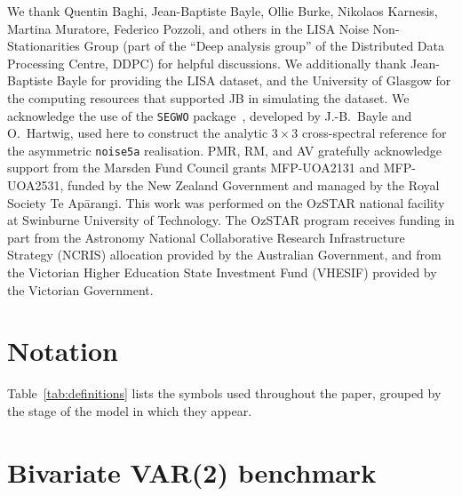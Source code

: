 \documentclass[%
	reprint,
	nofootinbib,
	amsmath,
	amssymb,
	aps,
]{revtex4-2}
\begin{document}
	\begin{acknowledgments}
		We thank Quentin Baghi, Jean-Baptiste Bayle, Ollie Burke, Nikolaos
		Karnesis, Martina Muratore, Federico Pozzoli, and others in the LISA Noise Non-Stationarities
		Group (part of the ``Deep analysis group'' of the Distributed Data Processing
		Centre, DDPC) for helpful discussions. We additionally thank Jean-Baptiste
		Bayle for providing the LISA dataset, and the University of Glasgow for the computing
		resources that supported JB in simulating the dataset. We
		acknowledge the use of the \texttt{SEGWO}
		package~\citep{bayle_segwo}, developed by J.-B.~Bayle and
		O.~Hartwig, used here to construct the analytic $3\times3$
		cross-spectral reference for the asymmetric \texttt{noise5a}
		realisation. PMR, RM, and AV
		gratefully acknowledge support from the Marsden Fund Council grants MFP-UOA2131 and MFP-UOA2531,
		funded by the New Zealand Government and managed by the Royal Society Te Apārangi.
		This work was performed on the OzSTAR national facility at Swinburne
		University of Technology. The OzSTAR program receives funding in part from
		the Astronomy National Collaborative Research Infrastructure Strategy (NCRIS)
		allocation provided by the Australian Government, and from the Victorian Higher
		Education State Investment Fund (VHESIF) provided by the Victorian Government.
	\end{acknowledgments}

	\appendix

	\section{Notation}
	\label{app:notation}

	Table~\ref{tab:definitions} lists the symbols used throughout the
	paper, grouped by the stage of the model in which they appear.

	

	\section{Bivariate VAR(2) benchmark}
	\label{app:var2_appendix}
\end{document}
